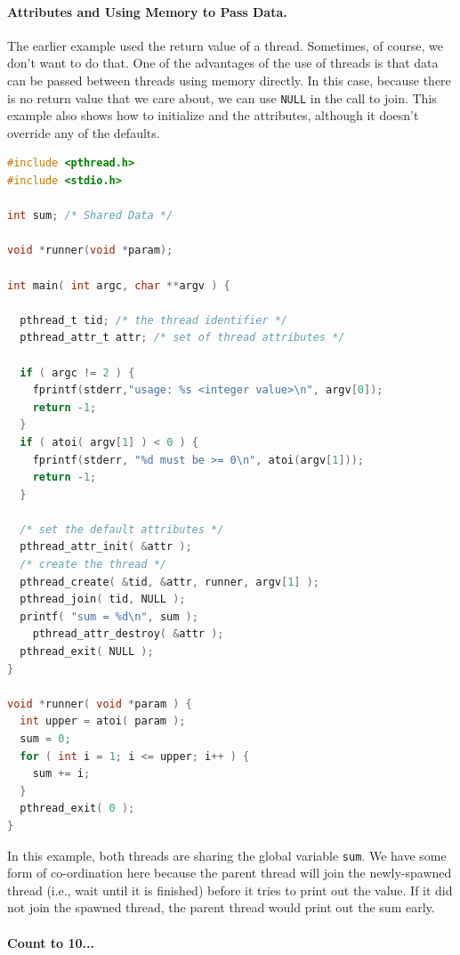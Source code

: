 \paragraph{Attributes and Using Memory to Pass Data.}
The earlier example used the return value of a thread. Sometimes, of course, we don't want to do that. One of the advantages of the use of threads is that data can be passed between threads using memory directly. In this case, because there is no return value that we care about, we can use \texttt{NULL} in the call to join. This example also shows how to initialize and the attributes, although it doesn't override any of the defaults.


\begin{lstlisting}[language=C]
#include <pthread.h>
#include <stdio.h>

int sum; /* Shared Data */

void *runner(void *param);

int main( int argc, char **argv ) {

  pthread_t tid; /* the thread identifier */
  pthread_attr_t attr; /* set of thread attributes */

  if ( argc != 2 ) {
    fprintf(stderr,"usage: %s <integer value>\n", argv[0]);
    return -1;
  }
  if ( atoi( argv[1] ) < 0 ) {
    fprintf(stderr, "%d must be >= 0\n", atoi(argv[1]));
    return -1;
  }

  /* set the default attributes */
  pthread_attr_init( &attr );
  /* create the thread */
  pthread_create( &tid, &attr, runner, argv[1] );
  pthread_join( tid, NULL );
  printf( "sum = %d\n", sum );
	pthread_attr_destroy( &attr );
  pthread_exit( NULL );
}

void *runner( void *param ) {
  int upper = atoi( param );
  sum = 0;
  for ( int i = 1; i <= upper; i++ ) {
    sum += i;
  }
  pthread_exit( 0 );
}
\end{lstlisting}

In this example, both threads are sharing the global variable \texttt{sum}. We have some form of co-ordination here because the parent thread will join the newly-spawned thread (i.e., wait until it is finished) before it tries to print out the value. If it did not join the spawned thread, the parent thread would print out the sum early.



\paragraph{Count to 10...}

